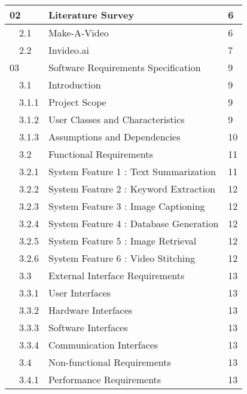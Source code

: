 \documentclass[12pt]{article}
\begin{document}
\begin{center}
\begin{tabular}{|p{0.35in}|p{0.4in}|p{3.3in}|p{0.8in}|}
\multicolumn{2}{|p{1in}|}{02 } & Literature Survey  & 6  \\ \hline 
  & 2.1  & Make-A-Video  & 6  \\ \hline 
  & 2.2  & Invideo.ai    & 7  \\ \hline
  
\multicolumn{2}{|p{1in}|}{03 } & Software Requirements Specification  & 9  \\ \hline 
  & 3.1  & Introduction  & 9  \\ \hline
  & 3.1.1 & Project Scope & 9 \\ \hline
  & 3.1.2 & User Classes and Characteristics & 9 \\ \hline
  & 3.1.3 & Assumptions and Dependencies & 10 \\ \hline
  & 3.2 & Functional Requirements & 11 \\ \hline
  & 3.2.1 & System Feature 1 : Text Summarization & 11 \\ \hline
  & 3.2.2 & System Feature 2 : Keyword Extraction & 12 \\ \hline
  & 3.2.3 & System Feature 3 : Image Captioning & 12 \\ \hline
  & 3.2.4 & System Feature 4 : Database Generation & 12 \\ \hline
  & 3.2.5 & System Feature 5 : Image Retrieval & 12 \\ \hline
  & 3.2.6 & System Feature 6 : Video Stitching & 12 \\ \hline
  & 3.3 & External Interface Requirements & 13 \\ \hline
  & 3.3.1 & User Interfaces & 13 \\ \hline
  & 3.3.2 & Hardware Interfaces & 13 \\ \hline
  & 3.3.3 & Software Interfaces & 13 \\ \hline
  & 3.3.4 & Communication Interfaces & 13 \\ \hline
  & 3.4 & Non-functional Requirements & 13 \\ \hline
  & 3.4.1 & Performance Requirements & 13 \\ \hline
  
\end{tabular}
\pagebreak{}
  

\end{center}
\end{document}
